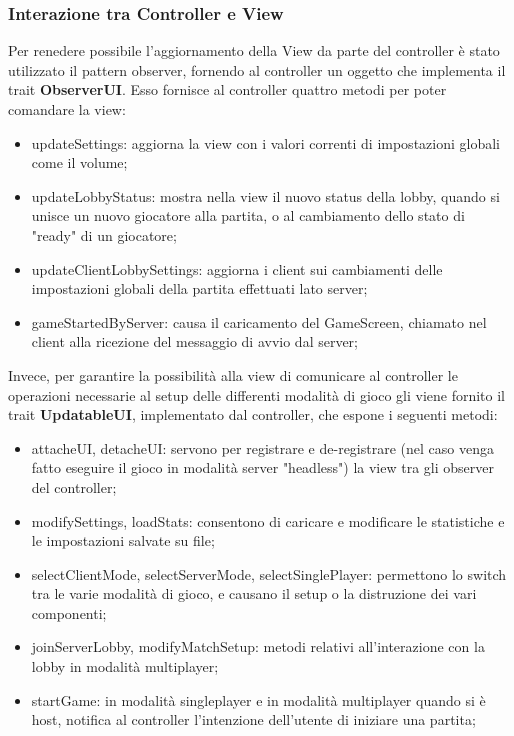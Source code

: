 \subsubsection{Interazione tra Controller e View}
Per renedere possibile l'aggiornamento della View da parte del controller è stato utilizzato il pattern observer, fornendo al controller un oggetto che implementa il trait \textbf{ObserverUI}. Esso fornisce al controller quattro metodi per poter comandare la view: 
\begin{itemize}
    \item updateSettings: aggiorna la view con i valori correnti di impostazioni globali come il volume;
    \item updateLobbyStatus: mostra nella view il nuovo status della lobby, quando si unisce un nuovo giocatore alla partita, o al cambiamento dello stato di "ready" di un giocatore;
    \item updateClientLobbySettings: aggiorna i client sui cambiamenti delle impostazioni globali della partita effettuati lato server; 
    \item gameStartedByServer: causa il caricamento del GameScreen, chiamato nel client alla ricezione del messaggio di avvio dal server;
\end{itemize}



Invece, per garantire la possibilità alla view di comunicare al controller le operazioni necessarie al setup delle differenti modalità di gioco gli viene fornito il trait \textbf{UpdatableUI}, implementato dal controller, che espone i seguenti metodi:
\begin{itemize}
    \item attacheUI, detacheUI: servono per registrare e de-registrare (nel caso venga fatto eseguire il gioco in modalità server "headless") la view tra gli observer del controller;
    \item modifySettings, loadStats: consentono di caricare e modificare le statistiche e le impostazioni salvate su file;
    \item selectClientMode, selectServerMode, selectSinglePlayer: permettono lo switch tra le varie modalità di gioco, e causano il setup o la distruzione dei vari componenti;
    \item joinServerLobby, modifyMatchSetup: metodi relativi all'interazione con la lobby in modalità multiplayer;
    \item startGame: in modalità singleplayer e in modalità multiplayer quando si è host, notifica al controller l'intenzione dell'utente di iniziare una partita;
\end{itemize}




